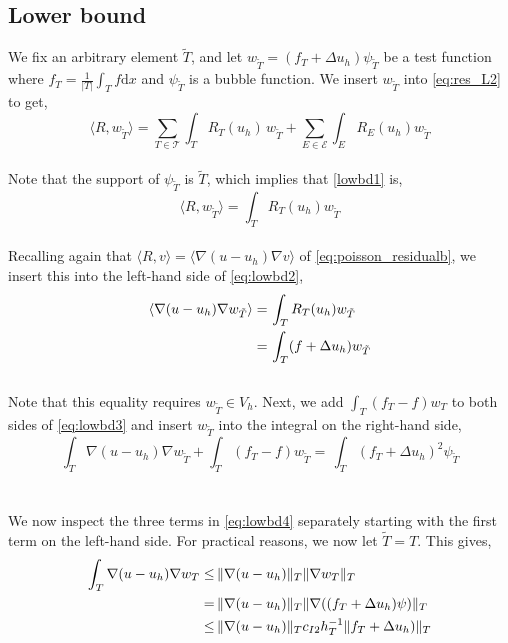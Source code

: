 \subsection{Lower bound} \label{section:poisson_lower bound}
We fix an arbitrary element $\tilde{T}$, and let $w_{\tilde{T}} = (f_T + \Delta u_h) \psi_{\tilde{T}}$ be a test function where $f_T = \frac{1}{|T|}\int_T f \mathrm{d}x$ and $\psi_{\tilde{T}}$ is a bubble function. We insert $w_{\tilde{T}}$ into \eqref{eq:res_L2} to get,
\begin{equation} \label{lowbd1}
\langle R, w_{\tilde{T}} \rangle = \displaystyle\sum_{T \in \mathcal{T}}\displaystyle\int_T R_T(u_h)\, w_{\tilde{T}} + \displaystyle\sum_{E \in \mathcal{E}}\displaystyle\int_E R_E(u_h) w_{\tilde{T}} 
\end{equation}
\\
Note that the support of $\psi_{\tilde{T}}$ is $\tilde{T}$, which implies that \eqref{lowbd1} is,
\begin{equation} \label{eq:lowbd2}
\langle R, w_{\tilde{T}} \rangle  =  \displaystyle\int_T R_T(u_h)w_{\tilde{T}}
\end{equation}
\\
Recalling again that $\langle R, v \rangle = \langle \nabla (u-u_h) \nabla v\rangle$ of \eqref{eq:poisson_residualb}, we insert this into the left-hand side of \eqref{eq:lowbd2},
\begin{align} \label{eq:lowbd3}
\langle \nabla (u-u_h) \nabla w_{\tilde{T}} \rangle = & \, \displaystyle\int_T R_T(u_h)w_{\tilde{T}} \\ 
= & \, \displaystyle\int_T (f+\Delta u_h) w_{\tilde{T}}  \notag 
\end{align}
\\
Note that this equality requires $w_{\tilde{T}} \in V_h$. Next, we add $\int_T (f_T - f) w_T$ to both sides of \eqref{eq:lowbd3} and insert $w_{\tilde{T}}$ into the integral on the right-hand side,
\begin{equation} \label{eq:lowbd4}
\displaystyle\int_T \nabla (u-u_h) \nabla w_{\tilde{T}} + \displaystyle\int_T (f_T - f) w_{\tilde{T}} = \, \displaystyle\int_T (f_T+\Delta u_h)^2 \psi_{\tilde{T}}
\end{equation}
\\
\\
We now inspect the three terms in \eqref{eq:lowbd4} separately starting with the first term on the left-hand side. For practical reasons, we now let $\tilde{T} = T$. This gives, 
\begin{align}\label{eq:lowbd5}
\displaystyle\int_T \nabla (u-u_h) \nabla w_T \leq & \, \| \nabla (u-u_h)\|_T\| \nabla w_T \|_T \\
= & \, \| \nabla (u-u_h)\|_T\| \nabla((f_T + \Delta u_h)\psi) \|_T \notag\\
\leq & \, \| \nabla (u-u_h)\|_T c_{I2}h_T^{-1} \|f_T + \Delta u_h)\|_T  \notag
\end{align}
